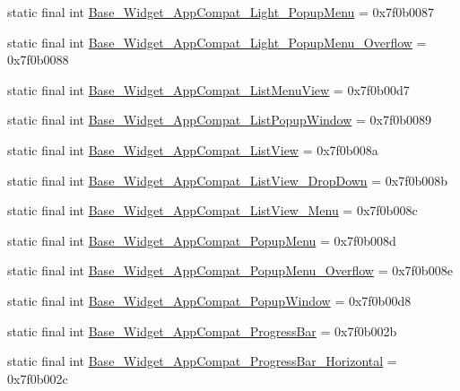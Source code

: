 \begin{CompactItemize}
\item 
static final int \hyperlink{classandroid_1_1support_1_1v7_1_1mediarouter_1_1_r_1_1style_2470c05db1c8fcb649daf795d2333584}{Base\_\-Widget\_\-AppCompat\_\-Light\_\-PopupMenu} = 0x7f0b0087
\item 
static final int \hyperlink{classandroid_1_1support_1_1v7_1_1mediarouter_1_1_r_1_1style_90667ddbb7b70ab403dd7f5a6245cf43}{Base\_\-Widget\_\-AppCompat\_\-Light\_\-PopupMenu\_\-Overflow} = 0x7f0b0088
\item 
static final int \hyperlink{classandroid_1_1support_1_1v7_1_1mediarouter_1_1_r_1_1style_d6a95cacf9661333ac1569668bcd0b93}{Base\_\-Widget\_\-AppCompat\_\-ListMenuView} = 0x7f0b00d7
\item 
static final int \hyperlink{classandroid_1_1support_1_1v7_1_1mediarouter_1_1_r_1_1style_2a50231f1b99f3d12a0130c69c5da325}{Base\_\-Widget\_\-AppCompat\_\-ListPopupWindow} = 0x7f0b0089
\item 
static final int \hyperlink{classandroid_1_1support_1_1v7_1_1mediarouter_1_1_r_1_1style_9b9932f0ff766c9cbb4c6dbd9d3dd936}{Base\_\-Widget\_\-AppCompat\_\-ListView} = 0x7f0b008a
\item 
static final int \hyperlink{classandroid_1_1support_1_1v7_1_1mediarouter_1_1_r_1_1style_66d25cdfafda42e031015df1c00802a2}{Base\_\-Widget\_\-AppCompat\_\-ListView\_\-DropDown} = 0x7f0b008b
\item 
static final int \hyperlink{classandroid_1_1support_1_1v7_1_1mediarouter_1_1_r_1_1style_bc053775c2abd192be024ce4dc49ac5f}{Base\_\-Widget\_\-AppCompat\_\-ListView\_\-Menu} = 0x7f0b008c
\item 
static final int \hyperlink{classandroid_1_1support_1_1v7_1_1mediarouter_1_1_r_1_1style_a84b2304332792c02d685ac3032d73ce}{Base\_\-Widget\_\-AppCompat\_\-PopupMenu} = 0x7f0b008d
\item 
static final int \hyperlink{classandroid_1_1support_1_1v7_1_1mediarouter_1_1_r_1_1style_42d503501115f5dd0227c7d7de676490}{Base\_\-Widget\_\-AppCompat\_\-PopupMenu\_\-Overflow} = 0x7f0b008e
\item 
static final int \hyperlink{classandroid_1_1support_1_1v7_1_1mediarouter_1_1_r_1_1style_47f5f941ab553af6c9c0a1942e95c904}{Base\_\-Widget\_\-AppCompat\_\-PopupWindow} = 0x7f0b00d8
\item 
static final int \hyperlink{classandroid_1_1support_1_1v7_1_1mediarouter_1_1_r_1_1style_e177a040c3661425c00923784c41b0b5}{Base\_\-Widget\_\-AppCompat\_\-ProgressBar} = 0x7f0b002b
\item 
static final int \hyperlink{classandroid_1_1support_1_1v7_1_1mediarouter_1_1_r_1_1style_f8b08fc61e3de806829c34febdfbd046}{Base\_\-Widget\_\-AppCompat\_\-ProgressBar\_\-Horizontal} = 0x7f0b002c

\end{CompactItemize}
